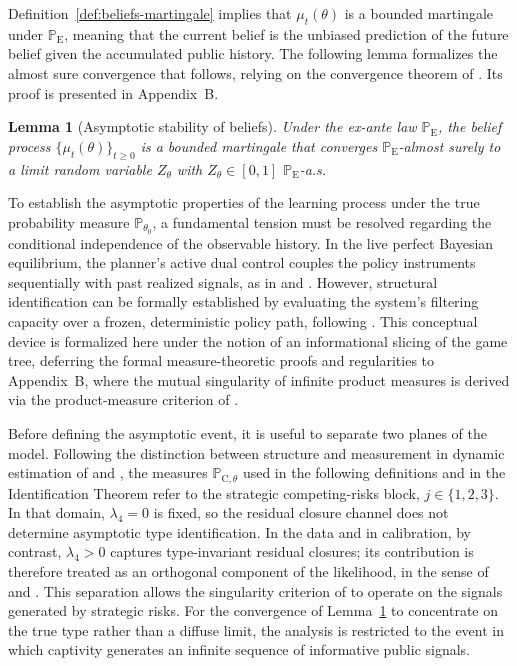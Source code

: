 \documentclass[pdflatex,sn-mathphys-ay]{sn-jnl}
\theoremstyle{plain}
\newtheorem{lemma}[theorem]{Lemma}
\theoremstyle{definition}
\newcommand{\ProbE}{\mathbb{P}_{\mathrm{E}}}
\newcommand{\ProbC}[1]{\mathbb{P}_{\mathrm{C},#1}}
\newcommand{\1}{\mathbf{1}}
\begin{document}
Definition~\ref{def:beliefs-martingale} implies that $\mu_t(\theta)$ is a bounded martingale under $\ProbE$, meaning that the current belief is the unbiased prediction of the future belief given the accumulated public history. The following lemma formalizes the almost sure convergence that follows, relying on the convergence theorem of \citet{Doob1953Stochastic}. Its proof is presented in Appendix~B.

\begin{lemma}[Asymptotic stability of beliefs]\label{lem:asymptotic-beliefs}
Under the ex-ante law $\ProbE$, the belief process $\{\mu_t(\theta)\}_{t\ge 0}$ is a bounded martingale that converges $\ProbE$-almost surely to a limit random variable $Z_\theta$ with $Z_\theta\in[0,1]$ $\ProbE$-a.s.
\end{lemma}

\smallskip

To establish the asymptotic properties of the learning process under the true probability measure $\mathbb{P}_{\theta_0}$, a fundamental tension must be resolved regarding the conditional independence of the observable history. In the live perfect Bayesian equilibrium, the planner's active dual control couples the policy instruments sequentially with past realized signals, as in \citet{AghionBoltonHarrisJullien1991} and \citet{EasleyKiefer1988}. However, structural identification can be formally established by evaluating the system's filtering capacity over a frozen, deterministic policy path, following \citet{BlackwellDubins1962}. This conceptual device is formalized here under the notion of an informational slicing of the game tree, deferring the formal measure-theoretic proofs and regularities to Appendix~B, where the mutual singularity of infinite product measures is derived via the product-measure criterion of \citet{Kakutani1948}.

Before defining the asymptotic event, it is useful to separate two planes of the model. Following the distinction between structure and measurement in dynamic estimation of \citet{Rust1987} and \citet{MagnacThesmar2002}, the measures $\ProbC{\theta}$ used in the following definitions and in the Identification Theorem refer to the strategic competing-risks block, $j\in\{1,2,3\}$. In that domain, $\lambda_4=0$ is fixed, so the residual closure channel does not determine asymptotic type identification. In the data and in calibration, by contrast, $\lambda_4>0$ captures type-invariant residual closures; its contribution is therefore treated as an orthogonal component of the likelihood, in the sense of \citet{Lancaster1990} and \citet{AbbringVanDenBerg2003}. This separation allows the singularity criterion of \citet{Kakutani1948} to operate on the signals generated by strategic risks. For the convergence of Lemma~\ref{lem:asymptotic-beliefs} to concentrate on the true type rather than a diffuse limit, the analysis is restricted to the event in which captivity generates an infinite sequence of informative public signals.
\end{document}
